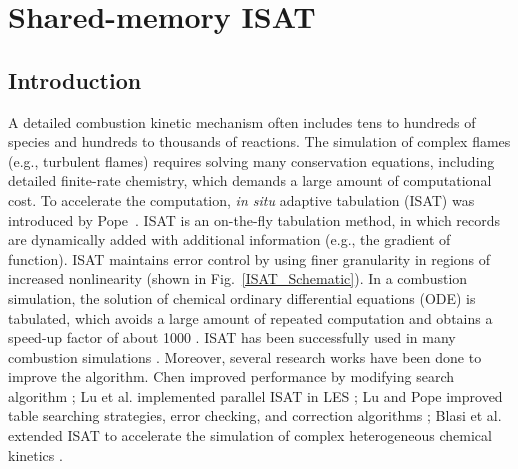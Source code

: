\chapter{Shared-memory ISAT}
\label{parISAT_bk}

\section{Introduction}

A detailed combustion kinetic mechanism often includes tens to hundreds of species and hundreds to thousands of reactions. The simulation of complex flames (e.g., turbulent flames) requires solving many conservation equations, including detailed finite-rate chemistry, which demands a large amount of computational cost. To accelerate the computation, \textit{in situ} adaptive tabulation (ISAT) was introduced by Pope~\cite{pope1997computationally}.
ISAT is an on-the-fly tabulation method, in which records are dynamically added with additional information (e.g., the gradient of function). ISAT maintains error control by using finer granularity in regions of increased nonlinearity (shown in Fig.~\ref{ISAT_Schematic}). In a combustion simulation, the solution of chemical ordinary differential equations (ODE) is tabulated, which avoids a large amount of repeated computation and obtains a speed-up factor of about 1000 \cite{pope1997computationally}. ISAT has been successfully used in many combustion simulations \cite{pope1997computationally,gordon2007numerical,wang2003application,singer2006modeling,singer2004exploiting,tang2002implementation}. Moreover, several research works have been done to improve the algorithm. Chen improved performance by modifying search algorithm \cite{chen2004analysis}; Lu et al. implemented parallel ISAT in LES \cite{lu2005investigation}; Lu and Pope improved table searching strategies, error checking, and correction algorithms \cite{lu2009improved}; Blasi et al. extended ISAT to accelerate the simulation of complex heterogeneous chemical kinetics \cite{blasi2016situ}.


